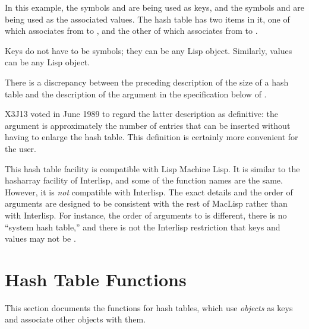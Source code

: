 In this example, the symbols  and  are being used as
keys, and the symbols  and  are being used as the
associated values.  The hash table has two items in it, one of which
associates from  to , and the other of which
associates from  to .

Keys do not have to be symbols; they can be any Lisp object.  Similarly,
values can be any Lisp object.

\begin{newer}
There is a discrepancy between the preceding description of the
size of a hash table and the description of the  argument
in the specification below
of .

X3J13 voted in June 1989  to regard the
latter description as definitive: the  argument
is approximately the number of entries that can be inserted
without having to enlarge the hash table.  This definition is certainly
more convenient for the user.
\end{newer}

\beforenoterule
\begin{incompatibility}
This hash table facility is compatible with Lisp Machine Lisp.  It
is similar to the hasharray facility of Interlisp, and some of the
function names are the same.  However, it is \emph{not} compatible with
Interlisp.  The exact details and the order of arguments are designed to
be consistent with the rest of MacLisp rather than with
Interlisp.  For instance, the order of arguments to  is
different, there is no ``system hash table,'' and there is not
the Interlisp restriction that keys and values may not be {\false}.
\end{incompatibility}
\afternoterule

\section{Hash Table Functions}

This section documents the functions for hash tables, which
use \emph{objects} as keys and associate other objects with them.

